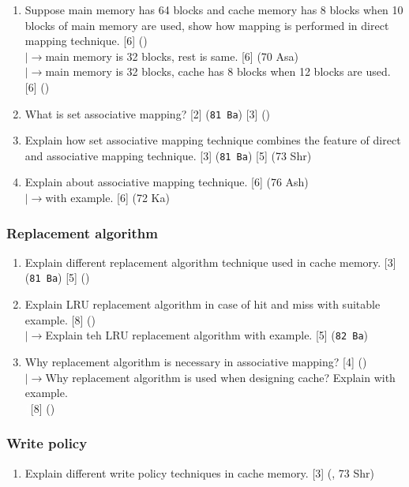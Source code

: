 \documentclass[12pt]{article}
\newcommand{\lb}{\\$\left|\rightarrow\right.$}
\newcommand{\enter}{\\\textcolor{white}{1}}
\begin{document}
\begin{enumerate}
			\item Suppose main memory has 64 blocks and cache memory has 8 blocks when 10 blocks of main memory are used, show how mapping is performed in direct mapping technique. \hfill [6] ()
			\lb main memory is 32 blocks, rest is same. \hfill [6] (70 Asa)
			\lb main memory is 32 blocks, cache has 8 blocks when 12 blocks are used. \hfill [6] ()

			\item What is set associative mapping? \hfill [2] (\texttt{81 Ba}) [3] ()

			\item Explain how set associative mapping technique combines the feature of direct and associative mapping technique. \hfill [3] (\texttt{81 Ba}) [5] (73 Shr)

			\item Explain about associative mapping technique. \hfill [6] (76 Ash)
			\lb with example. \hfill [6] (72 Ka)
		\end{enumerate}

	\subsubsection{Replacement algorithm}
		\begin{enumerate}
			\item Explain different replacement algorithm technique used in cache memory. \hfill [3] (\texttt{81 Ba}) [5] ()

			\item Explain LRU replacement algorithm in case of hit and miss with suitable example. \hfill [8] ()
			\lb Explain teh LRU replacement algorithm with example. \hfill [5] (\texttt{82 Ba})

			\item Why replacement algorithm is necessary in associative mapping? \hfill [4] ()
			\lb Why replacement algorithm is used when designing cache? Explain with example.
			\enter\hfill [8] ()
		\end{enumerate}

	\subsubsection{Write policy}
		\begin{enumerate}
			\item Explain different write policy techniques in cache memory. \hfill [3] (, 73 Shr)
		\end{enumerate}
\end{document}
